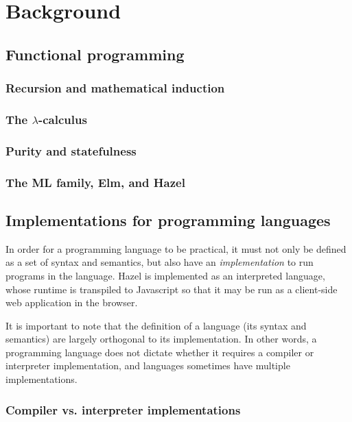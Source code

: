 \section{Background}
\label{sec:background}

\subsection{Functional programming}
\label{sec:fp}

\subsubsection{Recursion and mathematical induction}
\label{sec:recursion}

\subsubsection{The $\lambda$-calculus}
\label{sec:lambda_calculus}

\subsubsection{Purity and statefulness}
\label{sec:purity}

\subsubsection{The ML family, Elm, and Hazel}
\label{sec:ml_fam}

\subsection{Implementations for programming languages}
\label{sec:interpreters}

In order for a programming language to be practical, it must not only be defined as a set of syntax and semantics, but also have an \textit{implementation} to run programs in the language. Hazel is implemented as an interpreted language, whose runtime is transpiled to Javascript so that it may be run as a client-side web application in the browser.

It is important to note that the definition of a language (its syntax and semantics) are largely orthogonal to its implementation. In other words, a programming language does not dictate whether it requires a compiler or interpreter implementation, and languages sometimes have multiple implementations.

\subsubsection{Compiler vs. interpreter implementations}
\label{sec:comp_vs_interp}

